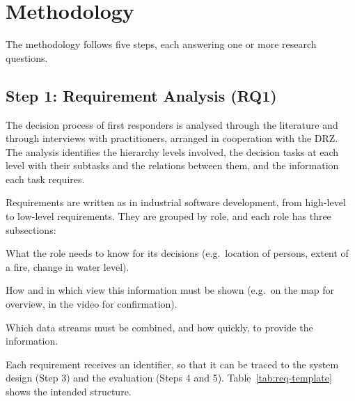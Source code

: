 \documentclass{article}
\begin{document}
\section{Methodology}
The methodology follows five steps, each answering one or more research questions.

\subsection{Step 1: Requirement Analysis (RQ1)}
The decision process of first responders is analysed through the literature \cite{surmann2024, kedia2020sa, hancko2026c2} and through interviews with practitioners, arranged in cooperation with the DRZ.
The analysis identifies the hierarchy levels involved, the decision tasks at each level with their subtasks and the relations between them, and the information each task requires.

Requirements are written as in industrial software development, from high-level to low-level requirements.
They are grouped by role, and each role has three subsections:
\begin{description}[style=nextline]
  \item[Information requirements] What the role needs to know for its decisions (e.g.\ location of persons, extent of a fire, change in water level).
  \item[Visualization requirements] How and in which view this information must be shown (e.g.\ on the map for overview, in the video for confirmation).
  \item[Integration requirements] Which data streams must be combined, and how quickly, to provide the information.
\end{description}
Each requirement receives an identifier, so that it can be traced to the system design (Step 3) and the evaluation (Steps 4 and 5).
Table~\ref{tab:req-template} shows the intended structure.
\end{document}
